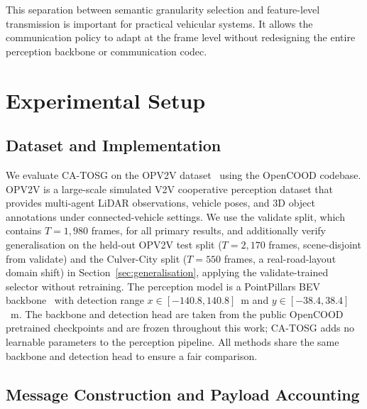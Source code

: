 \documentclass[journal]{IEEEtran}
\newcommand{\method}{CA-TOSG}
\begin{document}
This separation between semantic granularity selection and feature-level transmission is important for practical vehicular systems. It allows the communication policy to adapt at the frame level without redesigning the entire perception backbone or communication codec.

\section{Experimental Setup}\label{sec:exp}

\subsection{Dataset and Implementation}

We evaluate \method{} on the OPV2V dataset~\cite{xu2022opv2v} using the OpenCOOD codebase. OPV2V is a large-scale simulated V2V cooperative perception dataset that provides multi-agent LiDAR observations, vehicle poses, and 3D object annotations under connected-vehicle settings. We use the validate split, which contains $T=1{,}980$ frames, for all primary results, and additionally verify generalisation on the held-out OPV2V test split ($T=2{,}170$ frames, scene-disjoint from validate) and the Culver-City split ($T=550$ frames, a real-road-layout domain shift) in Section~\ref{sec:generalisation}, applying the validate-trained selector without retraining. The perception model is a PointPillars BEV backbone~\cite{lang2019pointpillars} with detection range $x \in [-140.8, 140.8]$~m and $y \in [-38.4, 38.4]$~m. The backbone and detection head are taken from the public OpenCOOD pretrained checkpoints and are frozen throughout this work; \method{} adds no learnable parameters to the perception pipeline. All methods share the same backbone and detection head to ensure a fair comparison.

\subsection{Message Construction and Payload Accounting}
\end{document}
